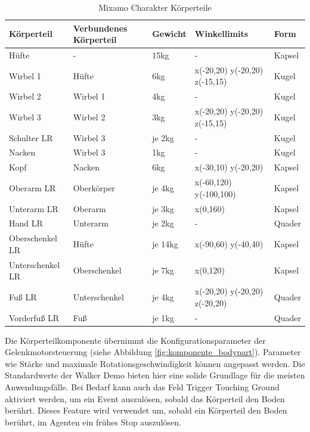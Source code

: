 \begin{table}[H]
  \centering
  {
  \begin{tabular}{ |p{3cm}|p{3cm}|p{2cm}|p{4cm}|p{2cm}| }
  \hline
  \textbf{Körpertei}l& \textbf{Verbundenes Körperteil} & \textbf{Gewicht} & \textbf{Winkellimits} & \textbf{Form} \\
  \hline
  Hüfte & - & 15kg & - & Kapsel \\
  \hline
  Wirbel 1 & Hüfte & 6kg & x(-20,20) y(-20,20) z(-15,15) & Kugel \\
  \hline
  Wirbel 2 & Wirbel 1 & 4kg & - & Kugel \\
  \hline
  Wirbel 3 & Wirbel 2 & 3kg & x(-20,20) y(-20,20) z(-15,15) & Kugel \\
  \hline
  Schulter LR & Wirbel 3 & je 2kg& - & Kugel \\
  \hline
  Nacken & Wirbel 3 & 1kg & - & Kugel \\
  \hline
  Kopf & Nacken & 6kg & x(-30,10) y(-20,20) & Kapsel \\
  \hline
  Oberarm LR & Oberkörper & je 4kg & x(-60,120) y(-100,100) & Kapsel \\
  \hline
  Unterarm LR & Oberarm & je 3kg & x(0,160) & Kapsel \\
  \hline
  Hand LR & Unterarm & je 2kg & - & Quader \\
  \hline
  Oberschenkel LR & Hüfte & je 14kg& x(-90,60) y(-40,40) & Kapsel \\
  \hline
  Unterschenkel LR & Oberschenkel & je 7kg &  x(0,120) & Kapsel \\
  \hline
  Fuß LR & Unterschenkel & je 4kg & x(-20,20) y(-20,20) z(-20,20) & Quader \\
  \hline
  Vorderfuß LR & Fuß & je 1kg & - & Quader \\
  \hline
  \end{tabular}}
  \caption{Mixamo Charakter Körperteile}
  \label{table:mixamo_körperteile}
\end{table}

Die Körperteilkomponente übernimmt die Konfigurationsparameter der Gelenkmotorsteuerung (siehe Abbildung \ref{fig:komponente_bodypart}). Parameter wie Stärke und maximale Rotationsgeschwindigkeit können angepasst werden. Die Standardwerte der Walker Demo bieten hier eine solide Grundlage für die meisten Anwendungsfälle. Bei Bedarf kann auch das Feld \grqq{}Trigger Touching Ground\grqq{} aktiviert werden, um ein Event auszulösen, sobald das Körperteil den Boden berührt. Dieses Feature wird verwendet um, sobald ein Körperteil den Boden berührt, im Agenten ein frühes Stop auszulösen.

